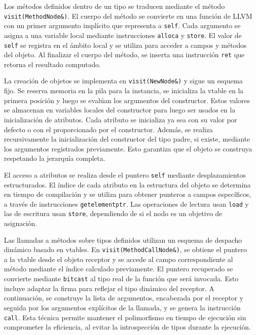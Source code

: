 \documentclass{llncs}
\begin{document}
	Los métodos definidos dentro de un tipo se traducen mediante el método \texttt{visit(MethodNode\&)}. El cuerpo del método se convierte en una función de LLVM con un primer argumento implícito que representa a \texttt{self}. Cada argumento se asigna a una variable local mediante instrucciones \texttt{alloca} y \texttt{store}. El valor de \texttt{self} se registra en el ámbito local y se utiliza para acceder a campos y métodos del objeto. Al finalizar el cuerpo del método, se inserta una instrucción \texttt{ret} que retorna el resultado computado.

	La creación de objetos se implementa en \texttt{visit(NewNode\&)} y sigue un esquema fijo. Se reserva memoria en la pila para la instancia, se inicializa la vtable en la primera posición y luego se evalúan los argumentos del constructor. Estos valores se almacenan en variables locales del constructor para luego ser usados en la inicialización de atributos. Cada atributo se inicializa ya sea con su valor por defecto o con el proporcionado por el constructor. Además, se realiza recursivamente la inicialización del constructor del tipo padre, si existe, mediante los argumentos registrados previamente. Esto garantiza que el objeto se construya respetando la jerarquía completa.

	El acceso a atributos se realiza desde el puntero \texttt{self} mediante desplazamientos estructurados. El índice de cada atributo en la estructura del objeto se determina en tiempo de compilación y se utiliza para obtener punteros a campos específicos, a través de instrucciones \texttt{getelementptr}. Las operaciones de lectura usan \texttt{load} y las de escritura usan \texttt{store}, dependiendo de si el nodo es un objetivo de asignación.

	Las llamadas a métodos sobre tipos definidos utilizan un esquema de despacho dinámico basado en vtables. En \texttt{visit(MethodCallNode\&)}, se obtiene el puntero a la vtable desde el objeto receptor y se accede al campo correspondiente al método mediante el índice calculado previamente. El puntero recuperado se convierte mediante \texttt{bitcast} al tipo real de la función que será invocada. Esto incluye adaptar la firma para reflejar el tipo dinámico del receptor. A continuación, se construye la lista de argumentos, encabezada por el receptor y seguida por los argumentos explícitos de la llamada, y se genera la instrucción \texttt{call}. Esta técnica permite mantener el polimorfismo en tiempo de ejecución sin comprometer la eficiencia, al evitar la introspección de tipos durante la ejecución.
\end{document}
